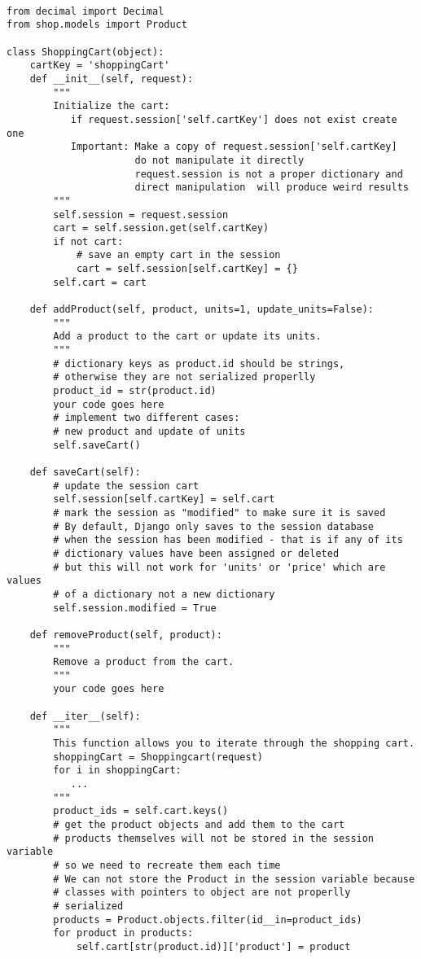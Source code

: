 \documentclass[12pt]{article} %
\newcommand{\ttt}[1]{\texttt{#1}}%
\begin{document}
\begin{lstlisting}[caption=template for class \ttt{ShoppingCart},label={lst:cart}]

from decimal import Decimal
from shop.models import Product

class ShoppingCart(object):
    cartKey = 'shoppingCart'
    def __init__(self, request):
        """
        Initialize the cart: 
           if request.session['self.cartKey'] does not exist create one
           Important: Make a copy of request.session['self.cartKey] 
                      do not manipulate it directly
                      request.session is not a proper dictionary and 
                      direct manipulation  will produce weird results
        """
        self.session = request.session
        cart = self.session.get(self.cartKey)
        if not cart:
            # save an empty cart in the session
            cart = self.session[self.cartKey] = {}
        self.cart = cart

    def addProduct(self, product, units=1, update_units=False):
        """
        Add a product to the cart or update its units.
        """
        # dictionary keys as product.id should be strings, 
        # otherwise they are not serialized properlly
        product_id = str(product.id)
        your code goes here
        # implement two different cases:
        # new product and update of units
        self.saveCart()

    def saveCart(self):
        # update the session cart
        self.session[self.cartKey] = self.cart
        # mark the session as "modified" to make sure it is saved
        # By default, Django only saves to the session database 
        # when the session has been modified - that is if any of its 
        # dictionary values have been assigned or deleted
        # but this will not work for 'units' or 'price' which are values
        # of a dictionary not a new dictionary
        self.session.modified = True

    def removeProduct(self, product):
        """
        Remove a product from the cart.
        """
        your code goes here

    def __iter__(self):
        """
        This function allows you to iterate through the shopping cart.
        shoppingCart = Shoppingcart(request)
        for i in shoppingCart:
           ...
        """
        product_ids = self.cart.keys()
        # get the product objects and add them to the cart
        # products themselves will not be stored in the session variable
        # so we need to recreate them each time
        # We can not store the Product in the session variable because
        # classes with pointers to object are not properlly
        # serialized
        products = Product.objects.filter(id__in=product_ids)
        for product in products:
            self.cart[str(product.id)]['product'] = product


\end{lstlisting}
\end{document}

